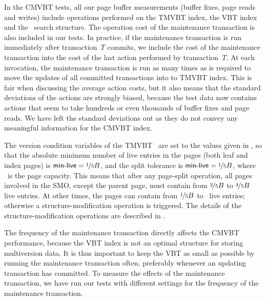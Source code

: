 In the CMVBT tests, all our page buffer measurements (buffer fixes, page
reads and writes) include operations performed on the TMVBT index, the VBT
index and the \rootstar\ search structure.
The operation cost of the maintenance transaction is also included in
our tests. 
In practice, if the maintenance transaction is run immediately after
transaction~$T$ commits, we include the cost of the maintenance transaction
into the cost of the last action performed by transaction~$T$.
At each invocation, the maintenance transaction is run as many times
as is required to move the updates of all committed transactions into to
TMVBT index.
This is fair when discussing the average action costs, but it also means that
the standard deviations of the actions are strongly biased, because the test
data now contains actions that seem to take hundreds or even thousands of
buffer fixes and page reads.
We have left the standard deviations out as they do not convey any meaningful
information for the CMVBT index.

The version condition variables of the
TMVBT~\cite{haapasalo:2009:tmvbt,becker:1996:mvbt} are set to the values given
in , so that the absolute minimum number of live
entries in the pages (both leaf and index pages) is $\text{\textsf{min-live}} =
\nicefrac{1}{5} B$, and the split tolerance is $\text{\textsf{min-live}} =
\nicefrac{1}{5} B$, where \capacity\ is the page capacity.
This means that after any page-split operation, all pages involved in the
SMO, except the parent page, must contain from  
$\nicefrac{2}{5} B$ to $\nicefrac{4}{5} B$ live entries. 
At other times, the pages can contain from
$\nicefrac{1}{5} B$ to \capacity\ live entries; otherwise a
structure-modification operation is triggered. 
The details of the structure-modification operations are described in
.

The frequency of the maintenance transaction directly
affects the CMVBT performance, because the VBT index is not an
optimal structure for storing multiversion data. 
It is thus important to keep the VBT as small as possible
by running the maintenance transaction often, preferably whenever an
updating transaction has committed. 
To measure the effects of the maintenance transaction, we have run our
tests with different settings for the frequency of the maintenance
transaction.

